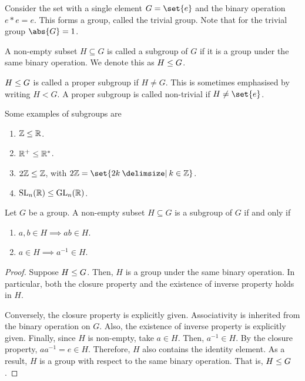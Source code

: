 \documentclass[11pt]{penrose}
\newcommand{\keyword}[1]{\textsf{#1}}
\begin{document}
\begin{negg}
    Consider the set with a single element $G = \set{e}$ and the binary operation $e * e = e$. This forms a group, called the \keyword{trivial group}. Note that for the trivial group $\abs{G} = 1$.
\end{negg}

\begin{ndfn}
    A non-empty subset $H \subseteq G$ is called a \keyword{subgroup} of $G$ if it is a group under the same binary operation. We denote this as $H \mathrel{\leq} G$.
\end{ndfn}

\begin{ndfn}
    $H \mathrel{\leq} G$ is called a \keyword{proper subgroup} if $H \neq G$. This is sometimes emphasised by writing $H < G$. A proper subgroup is called non-trivial if $H \neq \set{e}$.
\end{ndfn}

\begin{egg}
    Some examples of subgroups are
    \begin{enumerate}
        \item $\mathbb{Z} \mathrel{\leq} \mathbb{R}$.
        \item $\mathbb{R}^{+} \mathrel{\leq} \mathbb{R}^{*}$.
        \item $2\mathbb{Z} \mathrel{\leq} \mathbb{Z}$, with $2\Z = \set{2k \st k \in \Z}$.
        \item $\mathrm{SL}_{n}(\mathbb{R}) \mathrel{\leq} \mathrm{GL}_{n}(\mathbb{R})$.
    \end{enumerate}
\end{egg}

\begin{nthm}
    Let $G$ be a group. A non-empty subset $H \subseteq G$ is a subgroup of $G$ if and only if
    \begin{enumerate}
        \item $a, b \in H \implies ab \in H$.
        \item $a \in H \implies a^{-1} \in H$.
    \end{enumerate}
\end{nthm}
\begin{proof}
    Suppose $H \mathrel{\leq} G$. Then, $H$ is a group under the same binary operation. In particular, both the closure property and the existence of inverse property holds in $H$.

    Conversely, the closure property is explicitly given. Associativity is inherited from the binary operation on $G$. Also, the existence of inverse property is explicitly given. Finally, since $H$ is non-empty, take $a \in H$. Then, $a^{-1} \in H$. By the closure property, $a a^{-1} = e \in H$. Therefore, $H$ also contains the identity element. As a result, $H$ is a group with respect to the same binary operation. That is, $H \mathrel{\leq} G$.
\end{proof}
\end{document}
